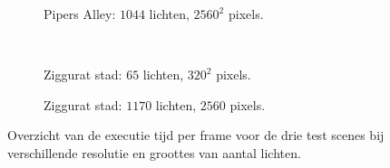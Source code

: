 \begin{figure}[t]
  \begin{adjustbox}{minipage=\textwidth, scale=0.6}
    \begin{subfigure}[b]{0.8\textwidth}
      \centering
      \def\svgwidth{\textwidth}
      
      \caption{Pipers Alley: $1044$ lichten, $2560^2$ pixels.}
      \label{fig:fds-test-frames:alley-high}
    \end{subfigure}
  \end{adjustbox} \\
  \begin{adjustbox}{minipage=\textwidth, scale=0.6}
    \begin{subfigure}[b]{0.8\textwidth}
      \centering
      \def\svgwidth{\textwidth}
      
      \caption{Ziggurat stad: $65$ lichten, $320^2$ pixels.}
      \label{fig:fds-test-frames:city-low}
    \end{subfigure}
  \end{adjustbox}\hspace{-0.075\textwidth} %
  \begin{adjustbox}{minipage=\textwidth, scale=0.6}
    \begin{subfigure}[b]{0.8\textwidth}
      \centering
      \def\svgwidth{\textwidth}
      
      \caption{Ziggurat stad: $1170$ lichten, $2560$ pixels.}
      \label{fig:fds-test-frames:city-high}
    \end{subfigure}
  \end{adjustbox}
  \caption{Overzicht van de executie tijd per frame voor de drie test scenes
           bij verschillende resolutie en groottes van aantal lichten.}
  \label{fig:fds-test-frames}
\end{figure}

